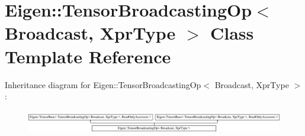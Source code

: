 \hypertarget{class_eigen_1_1_tensor_broadcasting_op}{}\section{Eigen\+:\+:Tensor\+Broadcasting\+Op$<$ Broadcast, Xpr\+Type $>$ Class Template Reference}
\label{class_eigen_1_1_tensor_broadcasting_op}
Inheritance diagram for Eigen\+:\+:Tensor\+Broadcasting\+Op$<$ Broadcast, Xpr\+Type $>$\+:\begin{figure}[H]
\begin{center}
\leavevmode
\includegraphics[height=1.031308cm]{class_eigen_1_1_tensor_broadcasting_op}
\end{center}
\end{figure}
